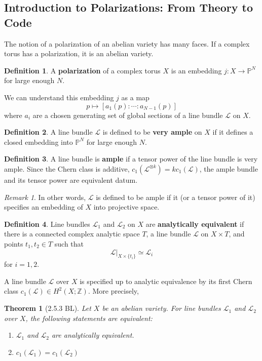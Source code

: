 \documentclass[12pt,reqno]{amsart}
\newcommand{\Z}{\mathbb{Z}}
\newcommand{\mc}{\mathcal}
\renewcommand{\P}{\mathbb{P}}
\newtheorem*{thm*}{Theorem}
\theoremstyle{definition}
\newtheorem{defn}{Definition}
\theoremstyle{remark}
\newtheorem*{remark}{Remark}
\begin{document}
\subsection{Introduction to Polarizations: From Theory to Code}
\label{sec:intropol}
The notion of a polarization of an abelian variety has many faces. If a complex torus has a polarization, it is an abelian variety.

\begin{defn} A \textbf{polarization} of a complex torus $X$ is an embedding $j: X \to \P^N$ for large enough $N$. \end{defn}


We can understand this embedding $j$ as a map $$p \mapsto [a_1(p) : \cdots : a_{N-1}(p)]$$ where $a_i$ are a chosen generating set of global sections of a line bundle $\mc{L}$ on $X$. 

\begin{defn} A line bundle $\mc{L}$ is defined to be \textbf{very ample} on $X$ if it defines a closed embedding into $\P^N$ for large enough $N$.
\end{defn}

\begin{defn} A line bundle is \textbf{ample} if a tensor power of the line bundle is very ample. Since the Chern class is additive, $c_1(\mc{L}^{\otimes k}) = kc_1(\mc{L})$, the ample bundle and its tensor power are equivalent datum. \end{defn} 

\begin{remark} In other words, $\mc{L}$ is defined to be ample if it (or a tensor power of it) specifies an embedding of $X$ into projective space.\end{remark}



\begin{defn} Line bundles $\mc{L}_1$ and $\mc{L}_2$  on $X$ are \textbf{analytically equivalent} if there is a connected complex analytic space $T$, a line bundle $\mc{L}$ on $X \times T$, and points $t_1, t_2 \in T$ such that $$\mc{L} |_{X\times \{t_i\}} \simeq \mc{L}_i$$ for $i = 1, 2$. \end{defn}

A line bundle $\mc{L}$ over $X$ is specified up to analytic equivalence by its first Chern class $c_1(\mc{L}) \in H^2(X; \Z)$. More precisely,

\begin{thm*} 
[2.5.3 BL] Let $X$ be an abelian variety. For line bundles $\mc{L}_1$ and $\mc{L}_2$ over $X$, the following statements are equivalent: 
\begin{enumerate} 
\item $\mc{L}_1$ and $\mc{L}_2$ are analytically equivalent.
\item $c_1(\mc{L}_1) = c_1(\mc{L}_2)$
\end{enumerate}
\end{thm*}
\end{document}
